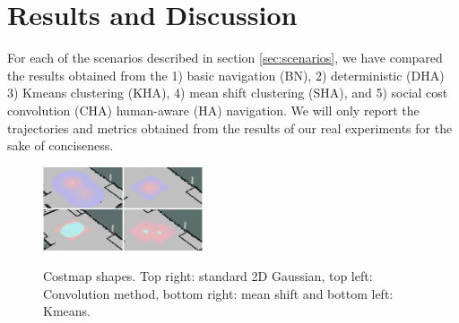 \section{Results and Discussion}
\label{res}

For each of the scenarios described in section \ref{sec:scenarios}, we have compared the results obtained from the 1) basic navigation (BN), 2) deterministic (DHA) 3) Kmeans clustering (KHA), 4) mean shift clustering (SHA), and 5) social cost convolution (CHA) human-aware (HA) navigation. We will only report the trajectories and metrics obtained from the results of our real experiments for the sake of conciseness.


\begin{figure}
\centering
{\includegraphics[width=0.42\textwidth]{pictures/all.eps}\label{fig:costmapPic}}%

\caption{Costmap shapes. Top right: standard 2D Gaussian, top left: Convolution method, bottom right: mean shift and bottom left: Kmeans.}
\label{fig:costmapPic}
\end{figure}


